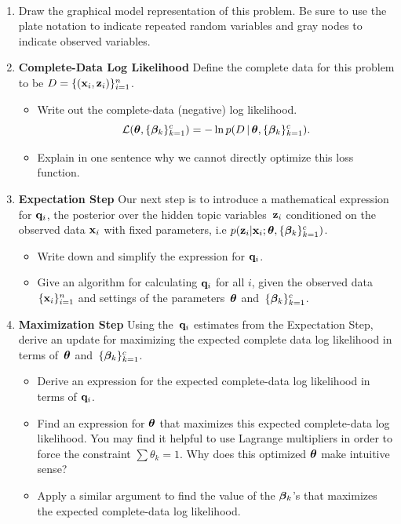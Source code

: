 \documentclass[submit]{harvardml}
\begin{document}
\begin{problem}
  ~

  \begin{enumerate}
    \item Draw the graphical model representation of this 
      problem. Be sure to use the plate notation to 
      indicate repeated random variables and gray nodes 
      to indicate observed variables.

\item \textbf{Complete-Data Log Likelihood} Define the complete data for this problem to be $D = \{(\mathbf{x}_i, \mathbf{z}_i)\}_{i=1}^n$. 
  \begin{itemize}
  \item Write out the complete-data (negative) log likelihood. \[\mathcal{L}(\boldsymbol{\theta}, \{\boldsymbol{\beta}_k\}^c_{k=1}) =  -\ln p(D \,|\,\boldsymbol{\theta}, \{\boldsymbol{\beta}_k\}^c_{k=1}).\] 
  \item Explain in one sentence why we cannot directly optimize this loss function.
  \end{itemize}



\item \textbf{Expectation Step}
Our next step is to introduce a mathematical expression for $\mathbf{q}_i$, the posterior over the hidden topic variables~$\mathbf{z}_i$ conditioned on the observed data $\mathbf{x}_i$ with fixed parameters, i.e $p(\mathbf{z}_i | \mathbf{x}_i; \boldsymbol{\theta}, \{\boldsymbol{\beta}_k\}^c_{k=1})$.

\begin{itemize}
\item  Write down and simplify the expression for $\mathbf{q}_i$. 
\item  Give an algorithm for calculating $\mathbf{q}_i$ for all $i$, given the observed data~$\{\mathbf{x}_i\}^n_{i=1}$ and settings of the parameters~$\boldsymbol{\theta}$ and~$\{\boldsymbol{\beta}_k\}^c_{k=1}$.

\end{itemize}

\item \textbf{Maximization Step}
Using the~$\mathbf{q}_i$ estimates from the Expectation Step, derive an update for maximizing the expected complete data log likelihood in terms of~$\boldsymbol{\theta}$ and~$\{\boldsymbol{\beta}_k\}^c_{k=1}$.

\begin{itemize}
    \item Derive an expression for the expected complete-data log likelihood in terms of $\mathbf{q}_i$.
    \item Find an expression for $\boldsymbol{\theta}$ that maximizes this expected complete-data log likelihood. You may find it helpful to use Lagrange multipliers in order to force the constraint $\sum \theta_k = 1$. Why does this optimized $\boldsymbol{\theta}$ make intuitive sense?
    \item Apply a similar argument to find the value of the $\boldsymbol{\beta}_{k}$'s that maximizes the expected complete-data log likelihood. 
\end{itemize}
\end{enumerate}

\end{problem}
\end{document}

